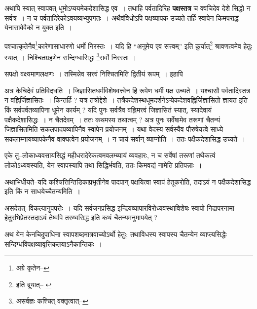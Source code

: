 \documentclass[article,12pt,a4paper]{memoir}
\begin{document}
	  \pstart अथापि स्यात् स्वापवत् धूमोऽप्ययमेकदेशासिद्ध एव । तथाहि पर्वतादिरिह \textbf{पक्षस्तत्र} च क्वचिदेव देशे सिद्धो न सर्वत्र । न च पर्वतादिरेकोऽवयव्यभ्युपगतः । अथैवंविधोऽपि पक्षव्यापक उच्यते तर्हि स्वापेन किमपराद्धं येनासावेवैको न युक्त इति ।
	\pend
	  \bigskip
	  \begingroup
	

	  \pstart पश्चात्कृतेनैव\footnote{अग्रे कृतेन--\cite{dp-msD-n}}\-कारेणासाधारणो धर्मो निरस्तः । यदि हि “अनुमेय एव सत्त्वम्” इति कुर्यात्\footnote{इति ब्रूयात्--\cite{dp-msB} \cite{dp-msD}} श्रावणत्वमेव हेतुः स्यात् । निश्चितग्रहणेन सन्दिग्धासिद्धः \footnote{असर्वज्ञः कश्चित् वक्तृत्वात्--\cite{dp-msD-n}}\-सर्वो निरस्तः ।
	\pend
       

	  \pstart सपक्षो वक्ष्यमाणलक्षणः । तस्मिन्नेव सत्त्वं निश्चितमिति द्वितीयं रूपम् । इहापि
	\pend
      
	  \endgroup
	

	  \pstart अत्र केचिदेवं प्रतिविदधति । जिज्ञासितधर्मविशेषवत्त्वेन हि रूपेण धर्मी पक्ष उच्यते । यश्चासौ पर्वतादिस्तत्र न वह्निर्जिज्ञासितः । किन्तर्हि ? यत्र तत्रोद्देशे । तत्रैकदेशस्थधूमदर्शनेऽप्येकदेशवह्निर्जिज्ञासितो ज्ञायत इति किं सर्वपर्वतव्यापिना धूमेन कार्यम् ? यदि पुनः सर्वत्रैव वह्निमत्त्वं जिज्ञासितं स्यात्, स्यादेवायं पक्षैकदेशासिद्धः । न चैतदेवम् । ततः कथमस्य तथात्वम् ? अत्र पुनः सर्वेषामेव तरूणां चैतन्यं जिज्ञासितमिति सकलपादपव्यापिनैव स्वापेन प्रयोजनम् । यथा वेदस्य सर्वस्यैव पौरुषेयत्वे साध्ये सकलाम्नायव्यापकेनैव वाक्यत्वेन प्रयोजनम् । न चायं सर्वान् व्याप्नोति । ततः पक्षैकदेशासिद्ध उच्यते ।
	\pend
      

	  \pstart एके तु--लोकाध्यवसायसिद्धं महीधरादेरेकत्वमवलम्ब्यायं व्यवहारः, न च सर्वेषां तरूणां तथैकत्वं लोकोऽध्यवस्यति, येन स्वापस्यापि तथा सिद्धिर्भवति, ततः किमवद्यं नामेति प्रतिपन्नाः ।
	\pend
      

	  \pstart अथाभिधीयते--यदि कश्चित्तिन्तिडिकाप्रभृतीनेव पादपान् पक्षयित्वा स्वापं हेतूकरोति, तदाऽयं न पक्षैकदेशासिद्ध इति किं न साधयेच्चैतन्यमिति ।
	\pend
      

	  \pstart असदेतत्--विकल्पानुपपत्तेः । यदि सर्वजनप्रसिद्ध इन्द्रियव्यापारविरोध्यवस्थाविशेषः स्वापो निद्रापरनामा हेतुरभिप्रेतस्तदाऽयं तेष्वपि तरुष्वसिद्ध इति कथं चैतन्यमनुमापयेत् ?
	\pend
      

	  \pstart अथ येन केनचिदुपाधिना स्वापशब्दमात्रवाच्योऽर्थो हेतुः; तथाविधस्य स्वापस्य चैतन्येन व्याप्त्यसिद्धेः सन्दिग्धविपक्षव्यावृत्तिकतयाऽनैकान्तिकः ।
	\pend
      
\end{document}
